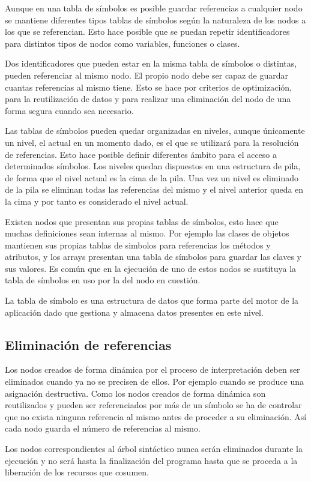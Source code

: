 Aunque en una tabla de símbolos es posible guardar referencias a cualquier nodo se mantiene diferentes tipos tablas de símbolos según la naturaleza de los nodos a los que se
referencian. Esto hace posible que se puedan repetir identificadores para distintos tipos de nodos como variables, funciones o clases.

Dos identificadores que pueden estar en la misma tabla de símbolos o distintas, pueden referenciar al mismo nodo. El propio nodo debe ser capaz de guardar cuantas referencias al 
mismo tiene. Esto se hace por criterios de optimización, para la reutilización de datos y para realizar una eliminación del nodo de una forma segura cuando sea necesario.

Las tablas de símbolos pueden quedar organizadas en niveles, aunque únicamente un nivel, el actual en un momento dado, es el que se utilizará para la resolución de referencias.
Esto hace posible definir diferentes ámbito para el acceso a determinados símbolos. Los niveles quedan dispuestos en una estructura de pila, de forma que el nivel actual es
la cima de la pila. Una vez un nivel es eliminado de la pila se eliminan todas las referencias del mismo y el nivel anterior queda en la cima y por tanto es considerado el nivel actual.

Existen nodos que presentan sus propias tablas de símbolos, esto hace que muchas definiciones sean internas al mismo. Por ejemplo las clases de objetos mantienen sus propias tablas
de simbolos para referencias los métodos y atributos, y los arrays presentan una tabla de símbolos para guardar las claves y sus valores. Es común que en la ejecución 
de uno de estos nodos se sustituya la tabla de símbolos en uso por la del nodo en cuestión.

La tabla de símbolo es una estructura de datos que forma parte del motor de la aplicación dado que gestiona y almacena datos presentes en este nivel. 

\subsection{Eliminación de referencias}
Los nodos creados de forma dinámica por el proceso de interpretación deben ser eliminados cuando ya no se precisen de ellos. Por ejemplo cuando se produce una asignación destructiva. Como
los nodos creados de forma dinámica son reutilizados y pueden ser referenciados por más de un símbolo se ha de controlar que no exista ninguna referencia al mismo 
antes de proceder a su eliminación. Así cada nodo guarda el número de referencias al mismo.

Los nodos correspondientes al árbol sintáctico nunca serán eliminados durante la ejecución y no será hasta la finalización del programa hasta que se proceda a la liberación de los recursos 
que cosumen.







